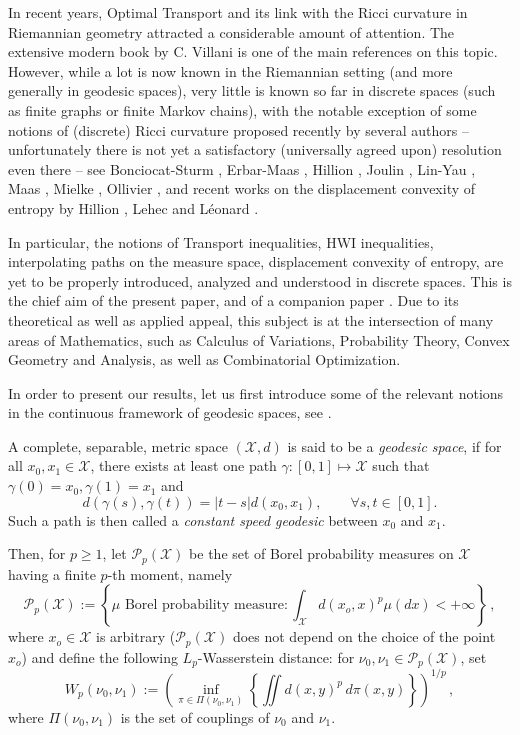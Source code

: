\documentclass[11pt]{amsart}
\numberwithin{equation}{section}
\begin{document}
In recent years, Optimal Transport and its link with the Ricci
curvature in Riemannian geometry attracted a considerable amount of attention. The extensive
modern book by C. Villani \cite{villani} is one of the main references on this topic. However, while a
lot is now known in the Riemannian setting (and more generally in geodesic spaces), very little is
known so far in discrete spaces (such as finite graphs or finite Markov chains), with the notable
exception of some notions of (discrete) Ricci curvature proposed recently by several authors --
unfortunately there is not yet a satisfactory (universally agreed upon) resolution even there --
see  Bonciocat-Sturm \cite{bonciocat}, Erbar-Maas \cite{erbar-maas}, Hillion \cite{hillionthesis}, Joulin \cite{joulin}, Lin-Yau \cite{lin-yau},    Maas \cite{maas},  Mielke \cite{mielke}, Ollivier \cite{ollivier}, and recent works on the displacement convexity of  entropy by Hillion \cite{hillion}, Lehec\cite{lehec} and L\'eonard \cite{leonard}. 

In particular,  the notions of Transport inequalities, 
HWI inequalities, interpolating paths on the measure space, displacement convexity of entropy, are yet to be properly introduced, analyzed and understood in discrete spaces. 
This is the chief aim of the present paper, and of a companion paper \cite{GRST}.
Due to its theoretical as well as applied appeal, this subject is at the intersection of many
areas of Mathematics, such as Calculus of Variations, Probability Theory, Convex Geometry
and Analysis, as well as Combinatorial Optimization.

\medskip

In order to present our results, let us first introduce some of the relevant notions in the continuous framework of geodesic spaces, see \cite{villani}.

A  complete, separable, metric space $({\mathcal{X}},d)$ is said to be a \emph{geodesic space}, if for all $x_0,x_1 \in {\mathcal{X}}$, there exists at least one path $\gamma \colon [0,1] \mapsto {\mathcal{X}}$ such that $\gamma(0)=x_0, \gamma(1)=x_1$ and 
$$
d(\gamma(s),\gamma(t))=|t-s|d(x_0,x_1), \qquad \forall s,t \in [0,1].
$$
Such a path is then called a \emph{constant speed geodesic} between $x_0$ and $x_1$.

Then, for $p \geq 1$, let $\mathcal{P}_p({\mathcal{X}})$ be the set of Borel probability measures on ${\mathcal{X}}$ having a finite $p$-th moment, namely
$$
\mathcal{P}_p({\mathcal{X}}) := \left\{ \mu \mbox{ Borel probability measure}: \int_{\mathcal{X}} d(x_o,x)^p \mu(dx) < + \infty  \right\} \,,
$$
where $x_o \in {\mathcal{X}}$ is arbitrary ($\mathcal{P}_p({\mathcal{X}})$ does not depend on the choice of the point $x_o$)
and define the following $L_p$-Wasserstein distance: for $\nu_0,\nu_1 \in \mathcal{P}_p({\mathcal{X}})$, set
\begin{equation} \label{t2}
W_p(\nu_0,\nu_1):= \left( \inf_{\pi \in \Pi(\nu_0,\nu_1)} \left\{ \iint d(x,y)^p \,d\pi(x,y) \right\} \right)^{1/p}\,,
\end{equation}
where $\Pi(\nu_0,\nu_1)$ is the set of couplings of  $\nu_0$ and $\nu_1$. 
\end{document}

